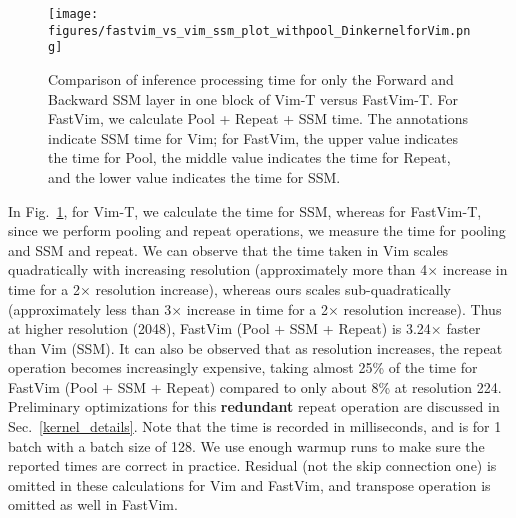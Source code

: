 \begin{enumerate}
\begin{figure}[!h]
\centering
    \texttt{[image: figures/fastvim\_vs\_vim\_ssm\_plot\_withpool\_DinkernelforVim.png]} 
    \caption{Comparison of inference processing time for only the Forward and Backward SSM layer in one block of Vim-T versus FastVim-T. For FastVim, we calculate Pool + Repeat + SSM time. The annotations indicate SSM time for Vim; for FastVim, the upper value indicates the time for Pool, the middle value indicates the time for Repeat, and the lower value indicates the time for SSM.}
\label{fig:fastvim_vs_vim_ssm_plot}
\end{figure}

\end{enumerate}

In Fig.~\ref{fig:fastvim_vs_vim_ssm_plot}, for Vim-T, we calculate the time for SSM, whereas for FastVim-T, since we perform pooling and repeat operations, we measure the time for pooling and SSM and repeat. We can observe that the time taken in Vim scales quadratically with increasing resolution (approximately more than 4$\times$ increase in time for a 2$\times$ resolution increase), whereas ours scales sub-quadratically (approximately less than 3$\times$ increase in time for a 2$\times$ resolution increase). Thus at higher resolution (2048), FastVim (Pool + SSM + Repeat) is 3.24$\times$ faster than Vim (SSM). It can also be observed that as resolution increases, the repeat operation becomes increasingly expensive, taking almost 25\% of the time for FastVim (Pool + SSM + Repeat) compared to only about 8\% at resolution 224. Preliminary optimizations for this \textbf{redundant} repeat operation are discussed in Sec.~\ref{kernel_details}. Note that the time is recorded in milliseconds, and is for 1 batch with a batch size of 128. We use enough warmup runs to make sure the reported times are correct in practice. Residual (not the skip connection one) is omitted in these calculations for Vim and FastVim, and transpose operation is omitted as well in FastVim.
\\



